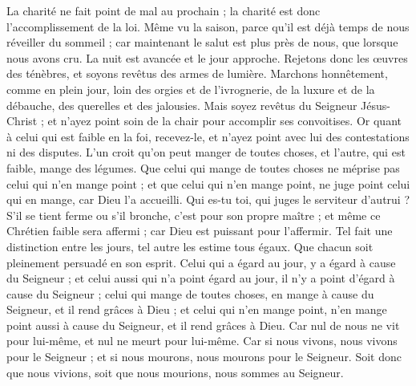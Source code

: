 \begin{multicols}{2}
La charité ne fait point de mal au prochain ; la charité est donc l'accomplissement de la loi.
Même vu la saison, parce qu’il est déjà temps de nous réveiller du sommeil ; car maintenant le salut est plus près de nous, que lorsque nous avons cru.
La nuit est avancée et le jour approche. Rejetons donc les œuvres des ténèbres, et soyons revêtus des armes de lumière.
Marchons honnêtement, comme en plein jour, loin des orgies et de l’ivrognerie, de la luxure et de la débauche, des querelles et des jalousies.
Mais soyez revêtus du Seigneur Jésus-Christ ; et n’ayez point soin de la chair pour accomplir ses convoitises.
\VerseOne{}Or quant à celui qui est faible en la foi, recevez-le, et n’ayez point avec lui des contestations ni des disputes.
L’un croit qu’on peut manger de toutes choses, et l'autre, qui est faible, mange des légumes.
Que celui qui mange de toutes choses ne méprise pas celui qui n'en mange point ; et que celui qui n'en mange point, ne juge point celui qui en mange, car Dieu l'a accueilli.
Qui es-tu toi, qui juges le serviteur d’autrui ? S’il se tient ferme ou s’il bronche, c’est pour son propre maître ; et même ce Chrétien faible sera affermi ; car Dieu est puissant pour l’affermir.
Tel fait une distinction entre les jours, tel autre les estime tous égaux. Que chacun soit pleinement persuadé en son esprit.
Celui qui a égard au jour, y a égard à cause du Seigneur ; et celui aussi qui n’a point égard au jour, il n’y a point d’égard à cause du Seigneur ; celui qui mange de toutes choses, en mange à cause du Seigneur, et il rend grâces à Dieu ; et celui qui n’en mange point, n’en mange point aussi à cause du Seigneur, et il rend grâces à Dieu.
Car nul de nous ne vit pour lui-même, et nul ne meurt pour lui-même.
Car si nous vivons, nous vivons pour le Seigneur ; et si nous mourons, nous mourons pour le Seigneur. Soit donc que nous vivions, soit que nous mourions, nous sommes au Seigneur.

\end{multicols}
